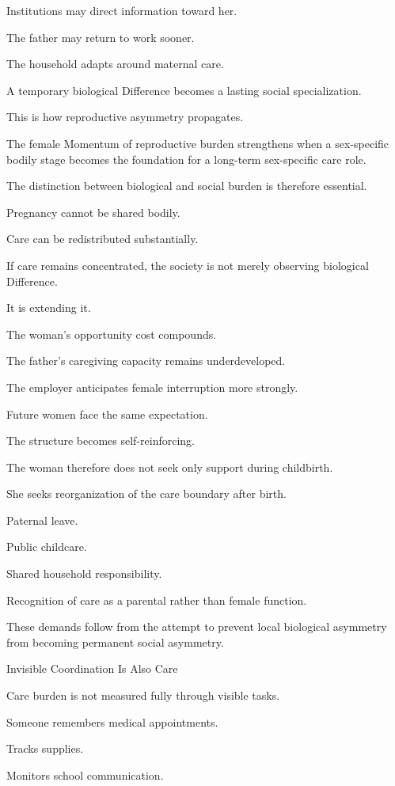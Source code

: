 Institutions may direct information toward her.

The father may return to work sooner.

The household adapts around maternal care.

A temporary biological Difference becomes a lasting social specialization.

This is how reproductive asymmetry propagates.

The female Momentum of reproductive burden strengthens when a sex-specific bodily stage becomes the foundation for a long-term sex-specific care role.

The distinction between biological and social burden is therefore essential.

Pregnancy cannot be shared bodily.

Care can be redistributed substantially.

If care remains concentrated, the society is not merely observing biological Difference.

It is extending it.

The woman’s opportunity cost compounds.

The father’s caregiving capacity remains underdeveloped.

The employer anticipates female interruption more strongly.

Future women face the same expectation.

The structure becomes self-reinforcing.

The woman therefore does not seek only support during childbirth.

She seeks reorganization of the care boundary after birth.

Paternal leave.

Public childcare.

Shared household responsibility.

Recognition of care as a parental rather than female function.

These demands follow from the attempt to prevent local biological asymmetry from becoming permanent social asymmetry.

Invisible Coordination Is Also Care

Care burden is not measured fully through visible tasks.

Someone remembers medical appointments.

Tracks supplies.

Monitors school communication.

